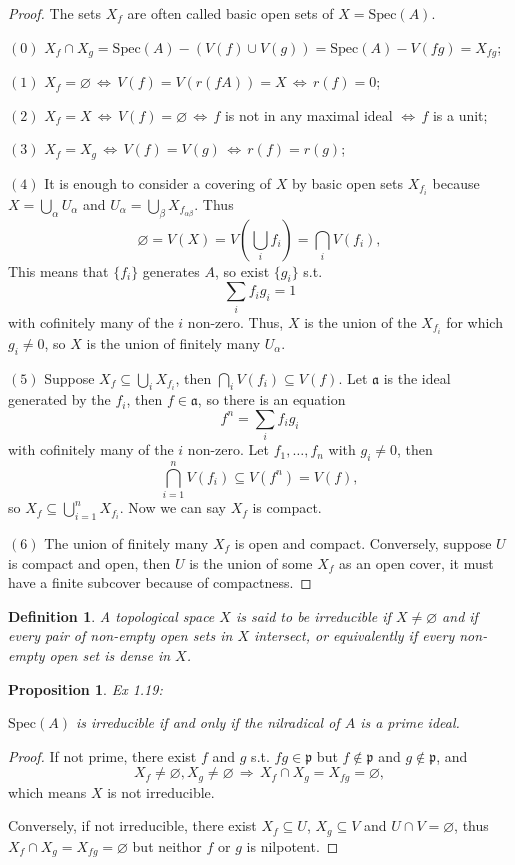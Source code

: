 \documentclass[11pt]{article}
\theoremstyle{plain}%
\newtheorem{pro}{Proposition}%
\newtheorem{defi}{Definition}%
\newcommand{\no}[1]{{$(#1)$}}  %
\newcommand{\fr}[1]{{\mathfrak{#1}}}
\begin{document}
\begin{proof} The sets $X_f$ are often called basic open sets of $X=\mathrm{Spec}(A)$.

	\no{0} $X_f\cap X_g=\mathrm{Spec}(A)-(V(f)\cup V(g))=\mathrm{Spec}(A)-V(fg)=X_{fg}$;

	\no{1} $X_f=\varnothing \, \Leftrightarrow\, V(f)=V(r(fA))=X \, \Leftrightarrow\, r(f)=0$;

	\no{2} $X_f=X \, \Leftrightarrow\, V(f)=\varnothing \, \Leftrightarrow\, f$ is not in any maximal ideal $\Leftrightarrow\, f$ is a unit;

	\no{3} $X_f=X_g \, \Leftrightarrow\, V(f)=V(g) \, \Leftrightarrow\, r(f)=r(g)$;

	\no{4} It is enough to consider a covering of $X$ by basic open sets $X_{f_i}$ because $X=\bigcup_\alpha U_\alpha$ and $U_\alpha=\bigcup_\beta X_{f_{\alpha \beta}}$. Thus
	\[
		\varnothing=V(X)=V\left(\bigcup_i f_i\right)=\bigcap_i V\left(f_i\right),
	\]
	This means that $\{f_i\}$ generates $A$, so exist $\{g_i\}$ s.t.
	\[
		\sum_i f_ig_i=1
	\]
	with cofinitely many of the $i$ non-zero. Thus, $X$ is the union of the $X_{f_i}$ for which $g_i\neq 0$, so $X$ is the union of finitely many $U_\alpha$.

	\no{5} Suppose $X_f\subseteq \bigcup_i X_{f_i}$, then $\bigcap_i V(f_i)\subseteq V(f)$. Let $\fr{a}$ is the ideal generated by the $f_i$, then $f\in \fr{a}$, so there is an equation
	\[
		f^n=\sum_i f_ig_i
	\]
	with cofinitely many of the $i$ non-zero. Let $f_1,\dots,f_n$ with $g_i\neq 0$, then
	\[
		\bigcap_{i=1}^n V(f_i)\subseteq V(f^n)=V(f),
	\]
	so $X_f\subseteq \bigcup_{i=1}^n X_{f_i}$. Now we can say $X_f$ is compact.

	\no{6}
	The union of finitely many $X_f$ is open and compact. Conversely, suppose $U$ is compact and open, then $U$ is the union of some $X_f$ as an open cover, it must have a finite subcover because of compactness.
\end{proof}

\begin{defi}
	A topological space $X$ is said to be irreducible if $X\neq \varnothing$ and if every pair of non-empty open sets in $X$ intersect, or equivalently if every non-empty open set is dense in $X$.
\end{defi}

\begin{pro}{\rm Ex 1.19}:

	$\mathrm{Spec}(A)$ is irreducible if and only if the nilradical of $A$ is a prime ideal.
\end{pro}

\begin{proof}
	If not prime, there exist $f$ and $g$ s.t. $fg\in \fr{p}$ but $f\notin \fr{p}$ and $g\notin \fr{p}$, and
	\[
		X_f\neq \varnothing,X_g\neq \varnothing \,\Rightarrow \,X_f\cap X_g=X_{fg}=\varnothing,
	\]
	which means $X$ is not irreducible.

	Conversely, if not irreducible, there exist $X_f\subseteq U$, $X_g\subseteq V$ and $U\cap V=\varnothing$, thus $X_f \cap X_g=X_{fg}=\varnothing$ but neithor $f$ or $g$ is nilpotent.
\end{proof}
\end{document}
